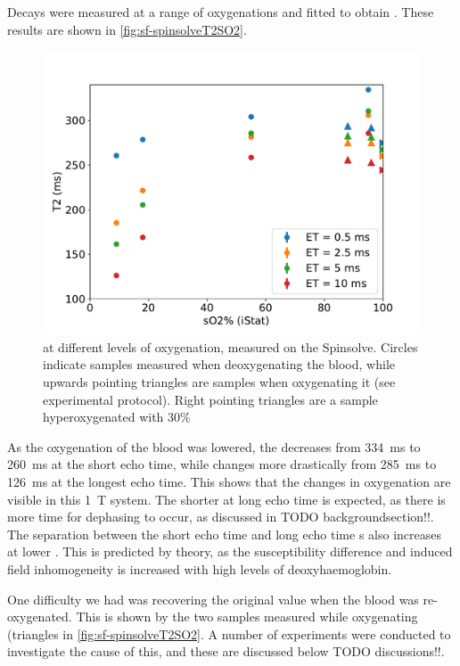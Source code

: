 Decays were measured at a range of oxygenations and fitted to obtain \Ttwo.
These results are shown in \autoref{fig:sf-spinsolveT2SO2}.

\begin{figure}[ht]
\centering
\includegraphics[width=\textwidth]{figures/stoppedflow/spinsolveT2SO2down.pdf}
\caption[\Ttwo vs. \SOtwo measured on the Spinsolve]{\Ttwo at different levels of oxygenation, measured on the Spinsolve. Circles indicate samples measured when deoxygenating the blood, while upwards pointing triangles are samples when oxygenating it (see experimental protocol). Right pointing triangles are a sample hyperoxygenated with 30\% \Otwo}
\label{fig:sf-spinsolveT2SO2}
\end{figure}


As the oxygenation of the blood was lowered, the \Ttwo decreases from \SI{334}{ms} to \SI{260}{ms} at the short echo time, while changes more drastically from \SI{285}{ms} to \SI{126}{ms} at the longest echo time.
This shows that the changes in oxygenation are visible in this \SI{1}{T} system.
The shorter \Ttwo at long echo time is expected, as there is more time for dephasing to occur, as discussed in TODO backgroundsection!!.
The separation between the short echo time and long echo time \Ttwo{}s also increases at lower \SOtwo.
This is predicted by theory, as the susceptibility difference and induced field inhomogeneity is increased with high levels of deoxyhaemoglobin.

One difficulty we had was recovering the original \Ttwo value when the blood was re-oxygenated.
This is shown by the two samples measured while oxygenating (triangles in \autoref{fig:sf-spinsolveT2SO2}.
A number of experiments were conducted to investigate the cause of this, and these are discussed below TODO discussions!!.


